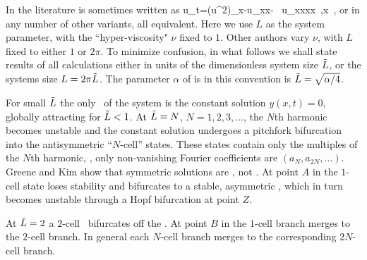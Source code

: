 
In the literature  is sometimes written as
\beq
    u_t=(u^2)_x-u_{xx}- \nu \, u_{xxxx}
    \,,\qquad   x \in [0,L]
    \,,
or in any number of other variants, all equivalent.
Here we use
$L$ as the system parameter, with the ``hyper-viscosity" $\nu$ fixed to $1$.
Other authors vary  $\nu$, with $L$ fixed to either $1$ or $2\pi$.
To minimize confusion,
in what follows we shall state results of all
calculations either in units of the dimensionless system size $\tilde{L}$,
or the systems size $L = 2 \pi \tilde{L}$. The parameter $\alpha$
of  is in this convention is
$\tilde{L}=\sqrt{\alpha/4}$.


For small $\tilde{L}$ the only \eqv\ of the system is the
constant solution $y(x,t)=0$,
globally attracting
for $\tilde{L}<1$. At $\tilde{L}=N$, $N=1,2,3, \dots$,
the $N$th harmonic becomes unstable and the constant solution
undergoes a pitchfork bifurcation into
the antisymmetric ``$N$-cell'' states.
These states contain only the multiples of the $N$th
harmonic, {\ie}, only non-vanishing Fourier coefficients
are $(a_N,a_{2N},\dots)$.
Greene and Kim show that symmetric solutions are \eqva, not \reqva.
At point $A$ in 
the $1$-cell state loses stability
and bifurcates to a stable,
asymmetric \reqv, which in turn becomes unstable
through a Hopf bifurcation at point $Z$.


At $\tilde{L}=2$ a $2$-cell \eqv\ bifurcates off the  \eqv.
At point $B$ in 
the $1$-cell branch merges to the $2$-cell branch.
In general each $N$-cell branch merges to the corresponding $2N$-cell branch.

